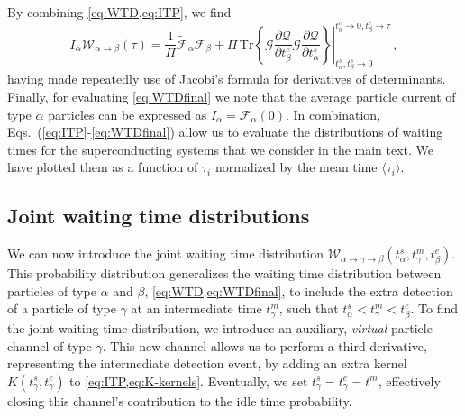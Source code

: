 \documentclass[aps,prl,amsmath,twocolumn,floatfix,superscriptaddress,longbibliography,footinbib]{revtex4-1}
\begin{document}
By combining \cref{eq:WTD,eq:ITP}, we find
\begin{equation}
	I_{\alpha} \mathcal{W}_{{\alpha} \rightarrow {\beta}}(\tau)=\frac{1}{\Pi}\tilde{\mathcal{F}}_{\alpha}\mathcal{F}_{\beta}
	+ \left. \Pi \, \mathrm{Tr}\left\{ \mathcal{G} \frac{\partial \mathcal{Q}}{\partial t^{e}_{\beta}}\mathcal{G} \frac{\partial \mathcal{Q}}{\partial t^{s}_{\alpha}} \right\} \right|_{t^{s}_\alpha,t^s_\beta\rightarrow 0}^{t^e_\alpha\rightarrow 0, t^{e}_\beta\rightarrow \tau} \,,
	\label{eq:WTDfinal}
\end{equation}
having made repeatedly use of Jacobi's formula for derivatives of determinants. Finally, for evaluating \cref{eq:WTDfinal} we note that the average particle current of type $\alpha$ particles can be expressed as $I_\alpha\!=\!\mathcal{F}_{\alpha}(0)$. In combination, Eqs.~(\ref{eq:ITP}-\ref{eq:WTDfinal}) allow us to evaluate the distributions of waiting times for the superconducting systems that we consider in the main text. We have plotted them as a function of $\tau_i$ normalized by the mean time $\langle \tau_i \rangle$. 

\subsection{Joint waiting time distributions}

We can now introduce the joint waiting time distribution $\mathcal{W}_{\alpha \rightarrow \gamma \rightarrow \beta}(t^s_\alpha,t^m_\gamma,t^e_\beta)$. This probability distribution generalizes the waiting time distribution between particles of type $\alpha$ and $\beta$, \cref{eq:WTD,eq:WTDfinal}, to include the extra detection of a particle of type $\gamma$ at an intermediate time $t^m_\gamma$, such that $t^s_\alpha<t^m_\gamma<t^e_\beta$. 
To find the joint waiting time distribution, we introduce an auxiliary, \textit{virtual} particle channel of type $\gamma$. This new channel allows us to perform a third derivative, representing the intermediate detection event, by adding an extra kernel $K(t^s_\gamma,t^e_\gamma)$ to \cref{eq:ITP,eq:K-kernels}. Eventually, we set $t^s_\gamma=t^e_\gamma=t^m$, effectively closing this channel's contribution to the idle time probability. 
\end{document}
